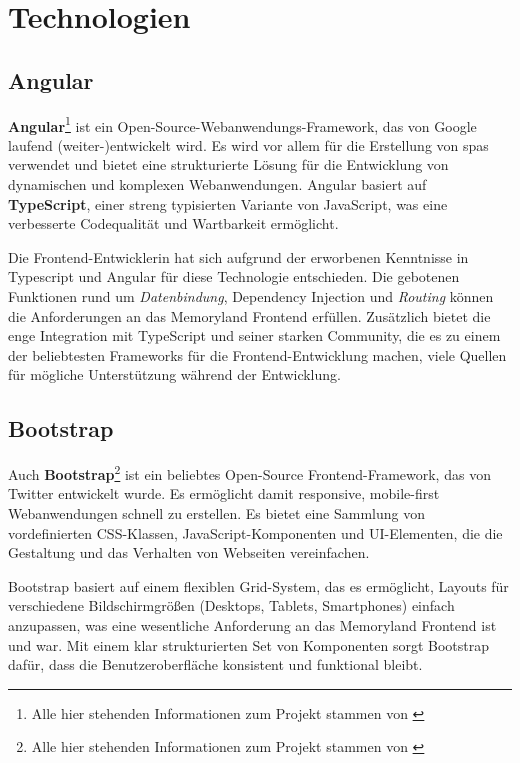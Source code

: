 
\section{Technologien}

\subsection{Angular}

\textbf{Angular}\footnote{Alle hier stehenden Informationen zum Projekt stammen von \cite{Angular}} ist ein Open-Source-Webanwendungs-Framework, das von Google laufend (weiter-)entwickelt wird. Es wird vor allem für die Erstellung von \Glspl{spa} verwendet und bietet eine strukturierte Lösung für die Entwicklung von dynamischen und komplexen Webanwendungen. Angular basiert auf \textbf{TypeScript}, einer streng typisierten Variante von JavaScript, was eine verbesserte Codequalität und Wartbarkeit ermöglicht.

Die Frontend-Entwicklerin hat sich aufgrund der erworbenen Kenntnisse in Typescript und Angular für diese Technologie entschieden. Die gebotenen Funktionen rund um \emph{Datenbindung}, Dependency Injection und \emph{Routing} können die Anforderungen an das Memoryland Frontend erfüllen. Zusätzlich bietet die enge Integration mit TypeScript und seiner starken Community, die es zu einem der beliebtesten Frameworks für die Frontend-Entwicklung machen, viele Quellen für mögliche Unterstützung während der Entwicklung.


\subsection{Bootstrap}

Auch \textbf{Bootstrap}\footnote{Alle hier stehenden Informationen zum Projekt stammen von \cite{Bootstrap}}  ist ein beliebtes Open-Source Frontend-Framework, das von Twitter entwickelt wurde. Es ermöglicht damit responsive, mobile-first Webanwendungen schnell zu erstellen. Es bietet eine Sammlung von vordefinierten CSS-Klassen, JavaScript-Komponenten und UI-Elementen, die die Gestaltung und das Verhalten von Webseiten vereinfachen. 

Bootstrap basiert auf einem flexiblen Grid-System, das es ermöglicht, Layouts für verschiedene Bildschirmgrö\ss{}en (Desktops, Tablets, Smartphones) einfach anzupassen, was eine wesentliche Anforderung an das Memoryland Frontend ist und war. Mit einem klar strukturierten Set von Komponenten sorgt Bootstrap dafür, dass die Benutzeroberfläche konsistent und funktional bleibt.

